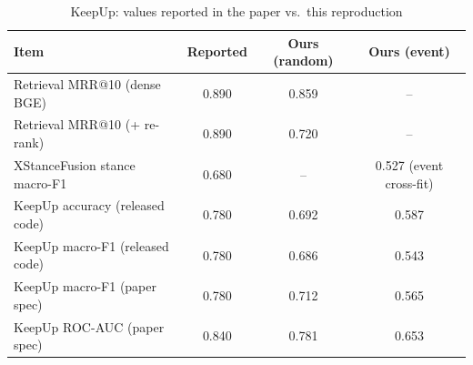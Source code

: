 \begin{table}[t]
\centering
\caption{KeepUp: values reported in the paper vs.\ this reproduction}
\label{tab:repro}
\footnotesize
\begin{tabular}{lccc}
\toprule
Item & Reported & Ours (random) & Ours (event)\\
\midrule
Retrieval MRR@10 (dense BGE) & 0.890 & 0.859 & --\\
Retrieval MRR@10 (+ re-rank) & 0.890 & 0.720 & --\\
XStanceFusion stance macro-F1 & 0.680 & -- & 0.527 (event cross-fit)\\
KeepUp accuracy (released code) & 0.780 & 0.692 & 0.587\\
KeepUp macro-F1 (released code) & 0.780 & 0.686 & 0.543\\
KeepUp macro-F1 (paper spec) & 0.780 & 0.712 & 0.565\\
KeepUp ROC-AUC (paper spec) & 0.840 & 0.781 & 0.653\\
\bottomrule
\end{tabular}
\end{table}
